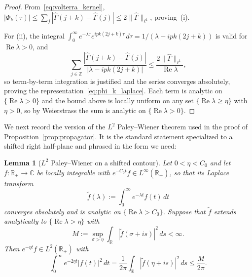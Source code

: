\documentclass[11pt]{amsart}
\newtheorem{lemma}[theorem]{Lemma}
\theoremstyle{definition}
\newcommand{\R}{\mathbb{R}}
\newcommand{\Z}{\mathbb{Z}}
\newcommand{\C}{\mathbb{C}}
\begin{document}
\begin{proof}
From~\eqref{eq:volterra_kernel}, $|\Phi_k(\tau)| \le\sum_j|\hat\Gamma(j{+}k)-\hat\Gamma(j)| \le 2\|\hat\Gamma\|_{\ell^1}$, proving~(i).

For (ii), the integral $\int_0^\infty e^{-\lambda\tau} e^{ipk(2j+k)\tau}\,d\tau =1/(\lambda-ipk(2j+k))$ is valid for $\operatorname{Re}\lambda>0$, and
\[
  \sum_{j\in\Z}
  \frac{|\hat\Gamma(j{+}k)-\hat\Gamma(j)|}
  {|\lambda-ipk(2j+k)|}
  \le
  \frac{2\|\hat\Gamma\|_{\ell^1}}
  {\operatorname{Re}\lambda},
\]
so term-by-term integration is justified and the series converges absolutely, proving the representation~\eqref{eq:phi_k_laplace}. Each term is analytic on $\{\operatorname{Re}\lambda>0\}$ and the bound above is locally uniform on any set $\{\operatorname{Re}\lambda\ge\eta\}$ with $\eta>0$, so by Weierstrass the sum is analytic on $\{\operatorname{Re}\lambda>0\}$.
\end{proof}

\medskip

We next record the version of the $L^2$ Paley--Wiener theorem used in the proof of Proposition~\ref{prop:propagator}. It is the standard statement
 specialized to a shifted right half-plane and phrased in the form we need: %

\begin{lemma}[$L^2$ Paley--Wiener on
a shifted contour]
\label{lem:PW_shifted}
Let $0<\eta<C_0$ and let $f\colon\R_+\to\C$ be locally integrable with $e^{-C_0 t}f\in L^\infty(\R_+)$, so that its Laplace transform
\[
  \tilde f(\lambda)
  :=\int_0^\infty e^{-\lambda t}
  f(t)\,dt
\]
converges absolutely and is analytic on $\{\operatorname{Re}\lambda>C_0\}$. Suppose that $\tilde f$ extends analytically to $\{\operatorname{Re}\lambda>\eta\}$ with
\begin{equation}\label{eq:PW_hyp}
  M:=\sup_{\sigma>\eta}
  \int_\R|\tilde f(\sigma+is)|^2\,ds
  <\infty.
\end{equation}
Then $e^{-\eta t}f\in L^2(\R_+)$ with
\begin{equation}\label{eq:PW_conclusion}
  \int_0^\infty e^{-2\eta t}
  |f(t)|^2\,dt
  = \frac{1}{2\pi}
  \int_\R |\tilde f(\eta+is)|^2\,ds
  \le \frac{M}{2\pi}.
\end{equation}
\end{lemma}
\end{document}
